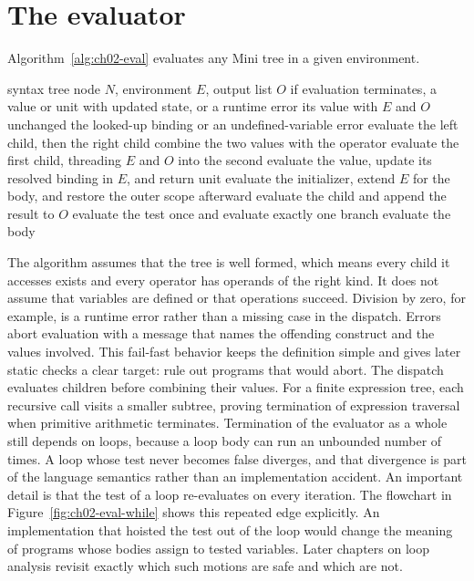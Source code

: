 \section{The evaluator}
\label{sec:ch02-evaluator}

Algorithm~\ref{alg:ch02-eval} evaluates any Mini tree in a given environment.
\begin{algorithm}
\caption{Tree-walking evaluation of Mini statements and expressions.}
\label{alg:ch02-eval}
\begin{pseudocode}
\Require syntax tree node $N$, environment $E$, output list $O$
\Ensure if evaluation terminates, a value or unit with updated state, or a runtime error
 \Return its value with $E$ and $O$ unchanged
 \Return the looked-up binding or an undefined-variable error
 \State evaluate the left child, then the right child
\State combine the two values with the operator
 \State evaluate the first child, threading $E$ and $O$ into the second
 \State evaluate the value, update its resolved binding in $E$, and return unit
 \State evaluate the initializer, extend $E$ for the body, and restore the outer scope afterward
 \State evaluate the child and append the result to $O$
 \State evaluate the test once and evaluate exactly one branch
  \State evaluate the body \EndWhile
\EndIf
\EndFunction
\end{pseudocode}
\end{algorithm}
The algorithm assumes that the tree is well formed, which means every child it accesses exists and every operator has operands of the right kind.
It does not assume that variables are defined or that operations succeed.
Division by zero, for example, is a runtime error rather than a missing case in the dispatch.
Errors abort evaluation with a message that names the offending construct and the values involved.
This fail-fast behavior keeps the definition simple and gives later static checks a clear target: rule out programs that would abort.
The dispatch evaluates children before combining their values.
For a finite expression tree, each recursive call visits a smaller subtree, proving termination of expression traversal when primitive arithmetic terminates.
Termination of the evaluator as a whole still depends on loops, because a loop body can run an unbounded number of times.
A loop whose test never becomes false diverges, and that divergence is part of the language semantics rather than an implementation accident.
An important detail is that the test of a loop re-evaluates on every iteration.
The flowchart in Figure~\ref{fig:ch02-eval-while} shows this repeated edge explicitly.
An implementation that hoisted the test out of the loop would change the meaning of programs whose bodies assign to tested variables.
Later chapters on loop analysis revisit exactly which such motions are safe and which are not.
